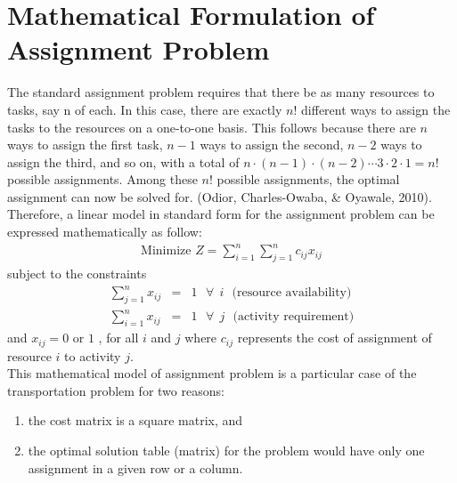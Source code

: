 \documentclass[11pt]{report}
\newcommand{\sps}{\\[0.2cm]}
\newcommand{\NI}{\noindent}
\renewcommand{\labelenumi}{\arabic{enumi})}
\begin{document}
	\section{Mathematical Formulation of Assignment Problem}
	The standard assignment problem requires that there be as many resources to tasks, say n of each. In this case, there are exactly $n!$ different ways to assign the tasks to the resources on a one-to-one basis. This follows because there are $n$ ways to assign the first task, $n-1$ ways to assign the second, $n-2$ ways to assign the third, and so on, with a total of $n \cdot (n-1) \cdot (n-2) \cdots 3 \cdot 2 \cdot 1 = n!$ possible assignments. Among these $n!$ possible assignments, the optimal assignment can now be solved for.
	(Odior, Charles-Owaba, \& Oyawale, 2010).\\
	
	\NI Therefore, a linear model in standard form for the assignment problem can be expressed mathematically as follow:
	\begin{eqnarray}
		\text{Minimize } Z = \sum_{i=1}^{n}\sum_{j=1}^{n}c_{ij}x_{ij}
	\end{eqnarray}
	subject to the constraints
	\begin{eqnarray}
		\sum_{j=1}^{n}x_{ij} &=& 1 ~~~\forall ~~i ~~~\text{(resource availability)}\sps
		\sum_{i=1}^{n}x_{ij} &=& 1 ~~~\forall ~~j ~~~\text{(activity requirement)}
	\end{eqnarray}
	and $x_{ij} = 0$ or $1$ , for all $i$ and $j$ where $c_{ij}$ represents the cost of assignment of resource $i$ to activity $j$.\\
	
	\NI This mathematical model of assignment problem is a particular case of the transportation
	problem for two reasons: 
	\begin{enumerate}
		\renewcommand{\labelenumi}{(\roman{enumi})}
		\item the cost matrix is a square matrix, and
		\item the optimal solution table (matrix) for the problem would have only one assignment in a given row or a column.
	\end{enumerate}
	
\end{document}
